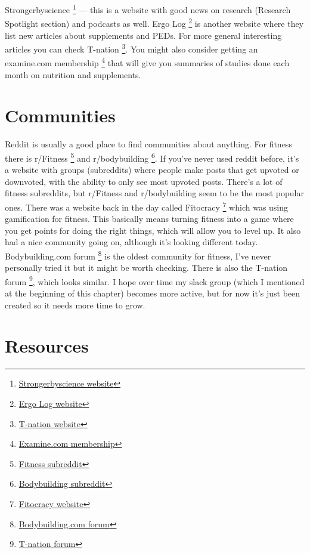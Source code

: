 \documentclass[openany, 12pt]{book}
\begin{document}
        Strongerbyscience
        \footnote{\href{https://www.strongerbyscience.com/}{Strongerbyscience website}} --- this is a website with good news on research (Research Spotlight section) and podcasts as well.
        Ergo Log
        \footnote{\href{https://www.ergo-log.com/}{Ergo Log website}} is another website where they list new articles about supplements and PEDs.
        For more general interesting articles you can check T-nation
        \footnote{\href{https://www.t-nation.com/}{T-nation website}}. You might also consider getting an examine.com membership
        \footnote{\href{https://examine.com/store/membership/}{Examine.com membership}} that will give you summaries of studies done each month on nutrition and supplements.
        
        \section{Communities}

        Reddit is usually a good place to find communities about anything. For fitness there is r/Fitness
        \footnote{\href{https://www.reddit.com/r/Fitness/}{Fitness subreddit}}
        and r/bodybuilding
        \footnote{\href{https://www.reddit.com/r/bodybuilding/}{Bodybuilding subreddit}}. If you've never used reddit before, it's a website with groups (subreddits) where people make
        posts that get upvoted or downvoted, with the ability to only see most upvoted posts. There's a lot of fitness subreddits, but r/Fitness and r/bodybuilding seem to be the most
        popular ones. There was a website back in the day called Fitocracy
        \footnote{\href{https://www.fitocracy.com/}{Fitocracy website}} which was using gamification for fitness. This basically means turning fitness into a game where you get points for
        doing the right things, which will allow you to level up. It also had a nice community going on, although it's looking different today. Bodybuilding.com forum
        \footnote{\href{https://forum.bodybuilding.com/index.php}{Bodybuilding.com forum}} is the oldest community for fitness, I've never personally tried it but it might be worth checking.
        There is also the T-nation forum
        \footnote{\href{https://forums.t-nation.com/}{T-nation forum}}, which looks similar. I hope over time my slack group (which I mentioned at the beginning of this chapter) 
        becomes more active, but for now it's just been created so it needs more time to grow.
        
        \section{Resources}
\end{document}
